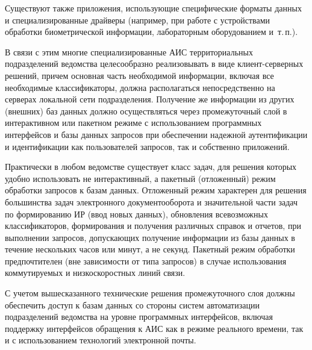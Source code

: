 \begin{multicols}{2}
      Существуют также приложения, использующие специфические форматы данных и 
специализированные драйверы (например, при работе с устройствами обработки 
биометрической информации, лабораторным оборудованием и~т.\,п.). 
      
      В связи с этим многие специализированные АИС территориальных подразделений 
ведомства целесообразно реализовывать в виде клиент-сер\-вер\-ных решений, причем основная 
часть необходимой информации, включая все необходимые классификаторы, должна 
располагаться непосредственно на серверах локальной сети подразделения. Получение же 
информации из других (внешних) баз данных должно осуществляться через промежуточный 
слой в интерактивном или пакетном режиме с использованием программных интерфейсов и 
базы данных запросов при обеспечении надежной аутентификации и идентификации как 
пользователей запросов, так и собственно приложений. 
      
      Практически в любом ведомстве существует класс задач, для решения которых удобно 
использовать не интерактивный, а пакетный (отложенный) режим обработки запросов к базам 
данных. Отложенный режим характерен для решения большинства задач электронного 
документооборота и значительной части задач по формированию ИР (ввод новых данных), 
обновления всевозможных классификаторов, формирования и получения различных справок и 
отчетов, при выполнении запросов, допускающих получение информации из базы данных в 
течение нескольких часов или минут, а не секунд. Пакетный режим обработки предпочтителен 
(вне зависимости от типа запросов) в случае использования коммутируемых и 
низкоскоростных линий связи.
      
      С учетом вышесказанного технические решения промежуточного слоя должны 
обеспечить доступ к базам данных со стороны систем автоматизации подразделений 
ведомства на уровне\linebreak
программных интерфейсов, включая поддержку интерфейсов обращения 
к АИС как в режиме реального времени, так и с использованием технологий электронной 
почты.

\begin{table*}\small
\begin{center}
\vspace*{2ex}


\end{center}
\end{table*}
\end{multicols}
